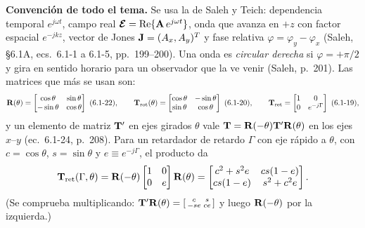 
\textbf{Convención de todo el tema.} Se usa la de Saleh y Teich: dependencia temporal
$e^{j\omega t}$, campo real $\boldsymbol{\mathcal E}=\mathrm{Re}\{\mathbf A\,e^{j\omega t}\}$, onda que avanza en $+z$
con factor espacial $e^{-jkz}$, vector de Jones $\mathbf J=(A_x,A_y)^T$ y fase relativa
$\varphi=\varphi_y-\varphi_x$ (Saleh, §6.1A, ecs.~6.1-1 a 6.1-5, pp.~199--200). Una onda es
\emph{circular derecha} si $\varphi=+\pi/2$ y gira en sentido horario para un observador que la
ve venir (Saleh, p.~201). Las matrices que más se usan son:
\[
\R(\theta)=\begin{bmatrix}\cos\theta&\sin\theta\\-\sin\theta&\cos\theta\end{bmatrix}\ (6.1\text{-}22),\qquad
\T_{\rm rot}(\theta)=\begin{bmatrix}\cos\theta&-\sin\theta\\ \sin\theta&\cos\theta\end{bmatrix}\ (6.1\text{-}20),\qquad
\T_{\rm ret}=\begin{bmatrix}1&0\\0&e^{-j\Gamma}\end{bmatrix}\ (6.1\text{-}19),
\]
y un elemento de matriz $\mathbf T'$ en ejes girados $\theta$ vale $\mathbf T=\mathbf R(-\theta)\mathbf T'\mathbf R(\theta)$ en los ejes
$x$--$y$ (ec.~6.1-24, p.~208). Para un retardador de retardo $\Gamma$ con eje rápido a $\theta$, con
$c=\cos\theta$, $s=\sin\theta$ y $e\equiv e^{-j\Gamma}$, el producto da
\begin{equation}
\mathbf T_{\rm ret}(\Gamma,\theta)=\mathbf R(-\theta)\begin{bmatrix}1&0\\0&e\end{bmatrix}\mathbf R(\theta)
=\begin{bmatrix}c^2+s^2e & cs(1-e)\\ cs(1-e) & s^2+c^2e\end{bmatrix}.
\label{eq:t3_retgen}
\end{equation}
(Se comprueba multiplicando: $\mathbf T'\mathbf R(\theta)=\left[\begin{smallmatrix}c&s\\-se&ce\end{smallmatrix}\right]$ y luego
$\mathbf R(-\theta)$ por la izquierda.)

